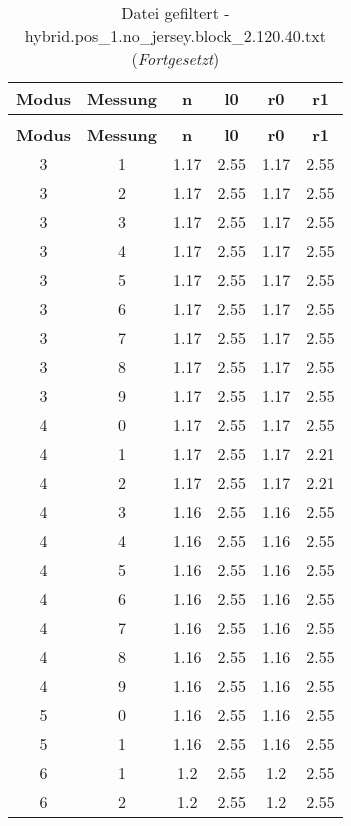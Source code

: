 \begin{longtable}{|c|c||c||c||c|c|}
	\caption{Datei gefiltert - hybrid.pos\_1.no\_jersey.block\_2.120.40.txt} \label{tab:hybrid.pos-1.no-jersey.block-2.120.40.txt} \\ \hline
	\textbf{Modus} & \textbf{Messung} & \textbf{n} & \textbf{l0} & \textbf{r0} & \textbf{r1}\\ \hline
	\endfirsthead
	\caption[]{Datei gefiltert - hybrid.pos\_1.no\_jersey.block\_2.120.40.txt (\emph{Fortgesetzt})} \\ \hline
	\textbf{Modus} & \textbf{Messung} & \textbf{n} & \textbf{l0} & \textbf{r0} & \textbf{r1}\\ \hline
	\endhead
	3 & 1 & 1.17 & 2.55 & 1.17 & 2.55 \\ \hline
	3 & 2 & 1.17 & 2.55 & 1.17 & 2.55 \\ \hline
	3 & 3 & 1.17 & 2.55 & 1.17 & 2.55 \\ \hline
	3 & 4 & 1.17 & 2.55 & 1.17 & 2.55 \\ \hline
	3 & 5 & 1.17 & 2.55 & 1.17 & 2.55 \\ \hline
	3 & 6 & 1.17 & 2.55 & 1.17 & 2.55 \\ \hline
	3 & 7 & 1.17 & 2.55 & 1.17 & 2.55 \\ \hline
	3 & 8 & 1.17 & 2.55 & 1.17 & 2.55 \\ \hline
	3 & 9 & 1.17 & 2.55 & 1.17 & 2.55 \\ \hline
	4 & 0 & 1.17 & 2.55 & 1.17 & 2.55 \\ \hline
	4 & 1 & 1.17 & 2.55 & 1.17 & 2.21 \\ \hline
	4 & 2 & 1.17 & 2.55 & 1.17 & 2.21 \\ \hline
	4 & 3 & 1.16 & 2.55 & 1.16 & 2.55 \\ \hline
	4 & 4 & 1.16 & 2.55 & 1.16 & 2.55 \\ \hline
	4 & 5 & 1.16 & 2.55 & 1.16 & 2.55 \\ \hline
	4 & 6 & 1.16 & 2.55 & 1.16 & 2.55 \\ \hline
	4 & 7 & 1.16 & 2.55 & 1.16 & 2.55 \\ \hline
	4 & 8 & 1.16 & 2.55 & 1.16 & 2.55 \\ \hline
	4 & 9 & 1.16 & 2.55 & 1.16 & 2.55 \\ \hline
	5 & 0 & 1.16 & 2.55 & 1.16 & 2.55 \\ \hline
	5 & 1 & 1.16 & 2.55 & 1.16 & 2.55 \\ \hline
	6 & 1 & 1.2 & 2.55 & 1.2 & 2.55 \\ \hline
	6 & 2 & 1.2 & 2.55 & 1.2 & 2.55 \\ \hline

\end{longtable}
